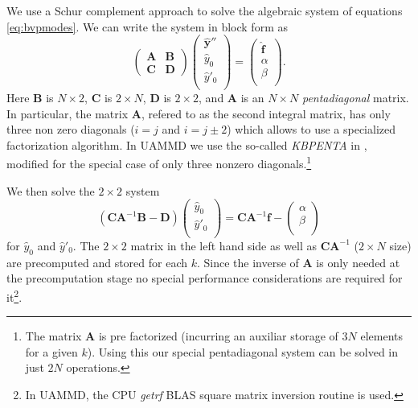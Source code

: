 \documentclass[ twoside,openright,titlepage,numbers=noenddot,%
headinclude,footinclude,cleardoublepage=empty,abstract=on,
BCOR=5mm,paper=a4,fontsize=11pt, dvipsnames
]{scrreprt}
\newcommand{\uammd}{\gls{UAMMD}\xspace}
\newcommand{\fou}[1]{\widehat{#1}}
\begin{document}
We use a Schur complement approach to solve the algebraic system of equations \eqref{eq:bvpmodes}. We can write the system in block form as 
\begin{equation}
\label{eq:blocksys}
\begin{pmatrix} \bm{A} & \bm{B} \\[2 pt] \bm{C} & \bm{D} \end{pmatrix}
\begin{pmatrix} \fou{\bm{y}}''\\ \fou{y}_0 \\ \fou{y}'_0 \\ \end{pmatrix}
= \begin{pmatrix}  \fou{\bm{f}}\\ \alpha \\ \beta\\ \end{pmatrix}. 
\end{equation}
Here $\bm{B}$ is $N \times 2$, $\bm{C}$ is $2 \times N$, $\bm{D}$ is $2 \times 2$, and $\bm{A}$ is an $N \times N$ \textit{pentadiagonal} matrix. In particular, the matrix $\bm{A}$, refered to as the second integral matrix, has only three non zero diagonals ($i=j$ and $i = j\pm 2$) which allows to use a specialized factorization algorithm. In \uammd we use the so-called \emph{KBPENTA} in \cite{Karawia2010}, modified for the special case of only three nonzero diagonals.\footnote{The matrix $\bm{A}$ is pre factorized (incurring an auxiliar storage of $3N$ elements for a given $k$). Using this our special pentadiagonal system can be solved in just $2N$ operations.} 

We then solve the $2 \times 2$ system
\begin{equation}
(\bm{C}\bm{A}^{-1}\bm{B}-\bm{D})\begin{pmatrix}  \fou{y}_0 \\ \fou{y}'_0\\ \end{pmatrix} = \bm{C}\bm{A}^{-1}\bm{f}-\begin{pmatrix}  \alpha \\ \beta\\ \end{pmatrix}
\end{equation}
for $\fou{y}_0$ and $\fou{y}'_0$. The $2\times 2$ matrix in the left hand side as well as $\bm{C}\bm{A}^{-1}$ ($2\times N$ size) are precomputed and stored for each $k$. Since the inverse of $\bm{A}$ is only needed at the precomputation stage no special performance considerations are required for it\footnote{In \uammd, the CPU \emph{getrf} BLAS square matrix inversion routine is used.}.
\end{document}
